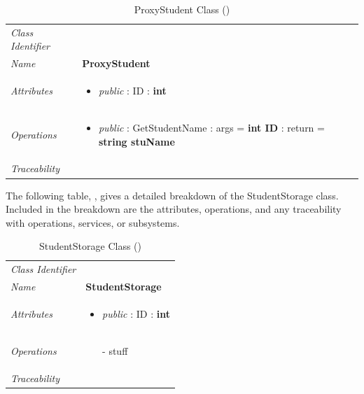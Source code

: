 \documentclass[12pt,letterpaper]{article}
\begin{document}
\begin{table}[H]
    \caption{ProxyStudent Class ()} 
	\begin{tabu} to 
		\toprule
		Class Identifier &  \\
		Name & {\bf ProxyStudent} \\
		Attributes & 
		\begin{minipage}[t]{\linewidth}
		    \begin{itemize}
		        \item \textit{public} : ID : \bf{int}
			\end{itemize}
	    \end{minipage} \\

		Operations &
		\begin{minipage}[t]{\linewidth}
			\begin{itemize}
			    \item \textit{public} : GetStudentName : args = {\bf int ID} : return = {\bf string stuName}
	        \end{itemize}
	    \end{minipage} \\
	    	Traceability & \\
		\toprule
	\end{tabu}
\end{table}

The following table, , gives a detailed breakdown of the StudentStorage class. Included in the breakdown are the attributes, operations, and any traceability with operations, services, or subsystems.

\begin{table}[H]
    \caption{StudentStorage Class ()} 
	\begin{tabu} to 
		\toprule
		Class Identifier &  \\
		Name & {\bf StudentStorage} \\
		Attributes & 
		\begin{minipage}[t]{\linewidth}
		    \begin{itemize}
		        \item \textit{public} : ID : \bf{int}
			\end{itemize}
	    \end{minipage} \\

		Operations &
		\begin{minipage}[t]{\linewidth}
			\begin{enumerate}
			    \item[-] stuff
	        \end{enumerate}
	    \end{minipage} \\
	    	Traceability & \\
		\toprule
	\end{tabu}
\end{table}
\end{document}
